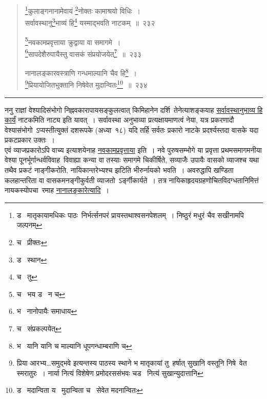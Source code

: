 \documentclass[11pt, openany]{book}
\begin{document}
\newpage

\begin{quote}
{\na \renewcommand{\thefootnote}{1}\footnote{ड \textendash\  मातृकायामधिकः पाठः\textendash\ निर्भर्त्सनपरं प्रायस्तथाश्वसनपेशलम्~। निष्ठुरं मधुरं चैव सखीनामपि जल्पनम्}कुलाङ्गनानामेवायं \renewcommand{\thefootnote}{2}\footnote{च \textendash\  प्रीक्तः}नोक्तः कामाश्रयो विधिः~।\\
सर्वावस्थानु\renewcommand{\thefootnote}{3}\footnote{ड \textendash\  स्थान}भाव्यं हि\renewcommand{\thefootnote}{4}\footnote{च \textendash\  तु} यस्माद्भवति नाटकम्~॥~२३२

\renewcommand{\thefootnote}{5}\footnote{च \textendash\  भय ड \textendash\  न च}नवकामप्रवृत्ताया क्रुद्वाया वा समागमे~।\\
\renewcommand{\thefootnote}{6}\footnote{भ \textendash\  नानोपायैः समाधाय}सापदेशैरुपायैस्तु वासकं संप्रयोजयेत्\renewcommand{\thefootnote}{7}\footnote{च \textendash\  संप्रकल्पयेत्}~॥~२३३

नानालङ्कारवस्त्राणि गन्धमाल्यानि चैव हि\renewcommand{\thefootnote}{8}\footnote{भ \textendash\  यानि यानि च माल्यानि धूपगन्धाम्बराणि च}~।\\
\renewcommand{\thefootnote}{9}\footnote{{\qt प्रिया} आरभ्य\ldots {\qt समुद्भवे} इत्यन्तस्य पाठस्य स्थाने भ मातृकायां तु\textendash\ हर्षात् सुखानि वस्तूनि निषे\textendash\ वेत स्मरातुरः~। नार्या नित्यं विशेषेण प्रमोदरससंभवः चड \textendash\  नित्यं सुखान्युदात्तानि}प्रियायोजितभुक्तानि निषेवेत मुदान्वितः\renewcommand{\thefootnote}{10}\footnote{ड \textendash\  मदान्विता य \textendash\  मुदान्विता च \textendash\  सेवेत मदनान्वितः}~॥~२३४}
\end{quote}

\hrule

\vspace{2mm}
ननु राज्ञां वेश्यादिसंभोगो निह्नवकारापायसङ्कुलत्वात् किमिहानेन दर्शि\textendash\ तेनेत्याशङ्कयाह \underline{सर्वावस्थानुभाव्य हि कार्यं} नाटकमिति नाट्य इति यावत्~। सर्वावस्था अनुभाव्या प्रत्यक्षायमाणत्वं नेया, यत्र प्रकरणादौ वेश्यासंभोगो\textendash\ ऽप्यस्तीत्युक्तं दशरूपके (अध्या\textendash\ १८) यदि तर्हि सर्वतः प्रकारो नाटके प्रदर्श्यस्तदा वासके यदा प्रकटप्रकार उक्तः~।\\

एवं व्याजप्रकारोऽपि वाच्य इत्याशयेनाह \underline{नवकामप्रवृत्ताया} इति~। नवे पुरुषसम्भोगे या प्रवृत्ता प्रथमसमागमनीया वेश्या पूनर्भूर्गान्धर्वविवाह\textendash\ विवाह्या कन्या वा तस्याः समागमे चिकीर्षिते, सव्याजैः उपायैः वासको व्याजश्च यथा तथैव प्रकटं नाङ्गीकरोति, नायिकान्तरेभ्यश्च झटिति भीरुर्नायको भवति~। अवरुद्धापि खण्डिता कलहान्तरिता वा वासकमनङ्गीकुर्वती व्याजतो\textendash\ ऽर्ङ्गीकार्यते~। तत्र नायिकाहृदयग्रहणोचितविदग्धतानिमित्तं नायकस्योपचा\textendash\ रमाह \underline{नानालङ्कारेत्यादि}~। 
\end{document}
